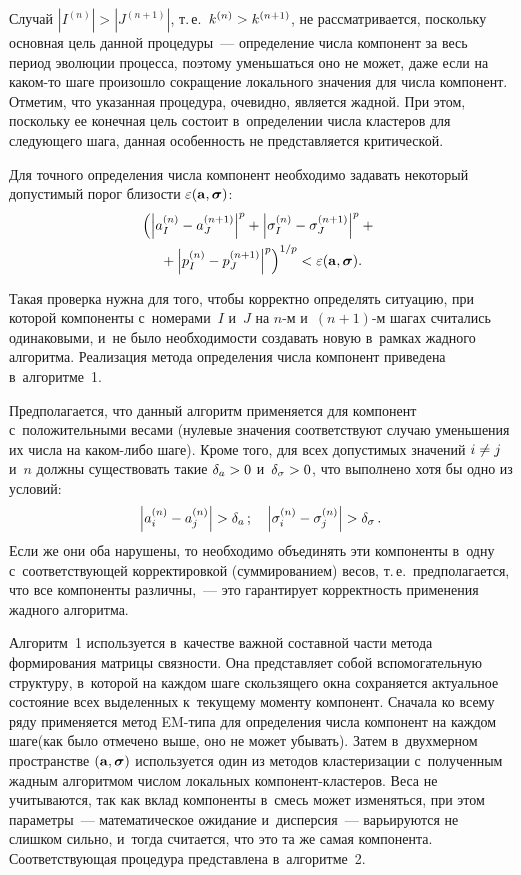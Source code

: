 \begin{multicols}{2}
Случай $\left|I^{(n)}\right|>\left|J^{(n+1)}\right|$, т.\,е.\
 $k^{(n)}\hm>k^{(n+1)}$, не рассматривается, поскольку основная цель 
 данной процедуры~--- определение чис\-ла компонент за весь период 
 эволюции процесса, поэтому уменьшаться оно не может, даже если 
 на ка\-ком-то шаге произошло сокращение локального значения для чис\-ла 
 компонент. Отметим, что указанная процедура, очевидно, является жад\-ной.
  При этом, поскольку ее конечная цель со\-сто\-ит в~определении чис\-ла 
  клас\-те\-ров для сле\-ду\-юще\-го шага, данная особенность не пред\-став\-ля\-ет\-ся 
  критической.

Для точного определения чис\-ла компонент необходимо задавать 
некоторый допустимый порог бли\-зости $\varepsilon({\bf a}, 
{\boldsymbol \sigma})$:
\begin{multline}
\label{Dist}
\left(\left|a_I^{(n)}-a_J^{(n+1)}\right|^p+
\left|\sigma_I^{(n)}-\sigma_J^{(n+1)}\right|^p +{}\right.\\
\left.{}+\left|p_I^{(n)}-
p_J^{(n+1)}\right|^p\right)^{1/p} < \varepsilon({\bf a}, 
{\boldsymbol \sigma}).
\end{multline}

Такая проверка нужна для того, чтобы корректно определять 
ситуацию, при которой компоненты с~номерами~$I$ и~$J$ на $n$-м и~$(n+1)$-м 
шагах считались одинаковыми, и~не было не\-об\-хо\-ди\-мости создавать новую 
в~рамках жад\-но\-го алгоритма. Реализация метода определения чис\-ла 
компонент приведена в~алгоритме~1.

Предполагается, что данный алгоритм применяется для 
компонент с~положительными весами (нулевые значения соответствуют 
случаю уменьшения их чис\-ла на ка\-ком-ли\-бо шаге). Кроме того, для 
всех допустимых значений $i\hm\neq j$ и~$n$ должны существовать такие 
$\delta_a\hm>0$ и~$\delta_\sigma\hm>0$, что выполнено хотя бы одно из 
условий: 
$$
\left|a_i^{(n)}\hm-a_j^{(n)}\right|\hm>\delta_a\,; \quad
\left|\sigma_i^{(n)}\hm-\sigma_j^{(n)}\right|\hm>\delta_\sigma\,.
$$
Если же они оба нарушены, то необходимо объединять эти компоненты в~одну 
с~соответствующей корректировкой (суммированием) весов, т.\,е.\ 
предполагается, что все компоненты различны,~--- 
это гарантирует кор\-рект\-ность применения жад\-но\-го алгоритма.

Алгоритм~1 используется в~качестве важ\-ной 
со\-став\-ной час\-ти  метода формирования матрицы связ\-ности. 
Она пред\-став\-ля\-ет собой вспомогательную структуру, в~которой 
на каждом шаге скользящего окна сохраняется актуальное 
со\-сто\-яние всех выделенных к~текущему моменту компонент. 
Сначала ко всему ряду применяется метод EM-ти\-па для 
определения числа компонент на каждом шаге\linebreak (как было отмечено выше, 
оно не может убывать). Затем в~двухмерном пространстве 
$(\bf a, \boldsymbol \sigma)$ используется один из методов 
кластеризации с~полученным жад\-ным алгоритмом чис\-лом локальных 
ком\-по\-нент-клас\-те\-ров. Веса не учитываются, так как вклад компоненты 
в~смесь может изменяться, при этом па\-ра\-мет\-ры~--- 
математическое ожидание и~дис\-пер\-сия~--- варьи\-ру\-ют\-ся 
не слишком сильно, и~тогда считается, что это та же самая компонента. 
Со\-от\-вет\-ст\-ву\-ющая процедура 
пред\-став\-ле\-на в~алго\-ритме~2.


\end{multicols}
